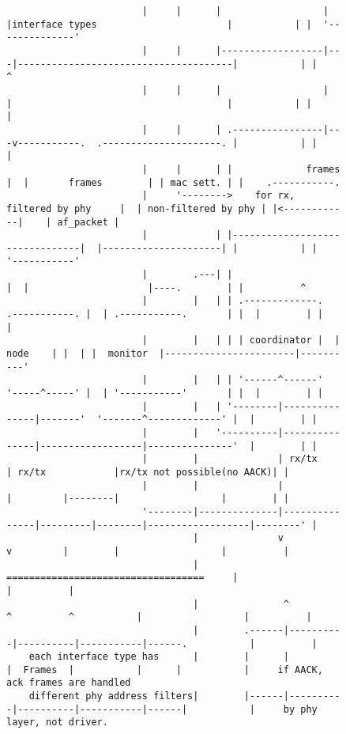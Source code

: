 \begin{figure}
{\begin{verbatim}
                        |     |      |                  |   |interface types                       |           | |  '--------------'
                        |     |      |------------------|---|--------------------------------------|           | |          ^
                        |     |      |                  |   |                                      |           | |          |
                        |     |      | .----------------|---v-----------.  .---------------------. |           | |          |
                        |     |      | |             frames             |  |       frames        | | mac sett. | |    .-----------.
                        |     '-------->    for rx, filtered by phy     |  | non-filtered by phy | |<------------|    | af_packet |
                        |            | |--------------------------------|  |---------------------| |           | |    '-----------'
                        |        .---| |                                |  |                     |----.        | |          ^
                        |        |   | | .-------------.  .-----------. |  | .-----------.       | |  |        | |          |
                        |        |   | | | coordinator |  |   node    | |  | |  monitor  |-----------------------|----------'
                        |        |   | | '------^------'  '-----^-----' |  | '-----------'       | |  |        | |
                        |        |   | '--------|---------------|-------'  '-------^-------------' |  |        | |
                        |        |   '----------|---------------|------------------|---------------'  |        | |
                        |        |              | rx/tx         | rx/tx            |rx/tx not possible(no AACK)| |
                        |        |              |               |         |--------|                  |        | |
                        '--------|--------------|---------------|---------|--------|------------------|--------' |
                                 |              v               v         |        |                  |          |
                                 |         ===================================     |                  |          |
                                 |               ^          ^          ^           |                  |          |
                                 |        .------|----------|----------|-----------|------.           |          |
    each interface type has      |        |      |          |  Frames  |           |      |           |     if AACK, ack frames are handled   
    different phy address filters|        |------|----------|----------|-----------|------|           |     by phy layer, not driver.         

\end{verbatim}}
\end{figure}
